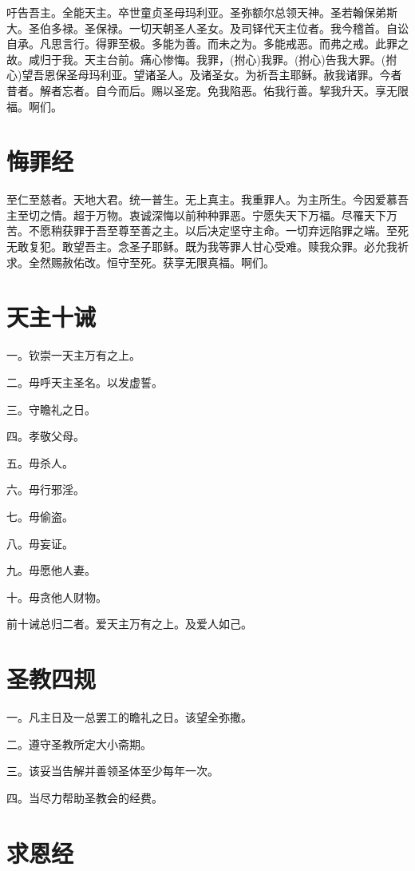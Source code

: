 \documentclass[UTF8,17pt]{ctexart}
\begin{document}
吁告吾主。全能天主。卒世童贞圣母玛利亚。圣弥额尔总领天神。圣若翰保弟斯大。圣伯多禄。圣保禄。一切天朝圣人圣女。及司铎代天主位者。我今稽首。自讼自承。凡思言行。得罪至极。多能为善。而未之为。多能戒恶。而弗之戒。此罪之故。咸归于我。天主台前。痛心惨悔。我罪，(拊心)我罪。(拊心)告我大罪。(拊心)望吾恩保圣母玛利亚。望诸圣人。及诸圣女。为祈吾主耶稣。赦我诸罪。今者昔者。解者忘者。自今而后。赐以圣宠。免我陷恶。佑我行善。挈我升天。享无限福。啊们。

\section{悔罪经}
\label{hui-zui-jing}

至仁至慈者。天地大君。统一普生。无上真主。我重罪人。为主所生。今因爱慕吾主至切之情。超于万物。衷诚深悔以前种种罪恶。宁愿失天下万福。尽罹天下万苦。不愿稍获罪于吾至尊至善之主。以后决定坚守主命。一切弃远陷罪之端。至死无敢复犯。敢望吾主。念圣子耶稣。既为我等罪人甘心受难。赎我众罪。必允我祈求。全然赐赦佑改。恒守至死。获享无限真福。啊们。

\section{天主十诫}
\label{tian-zhu-shi-jie}

一。钦崇一天主万有之上。 

二。毋呼天主圣名。以发虚誓。 

三。守瞻礼之日。 

四。孝敬父母。

五。毋杀人。

六。毋行邪淫。

七。毋偷盗。

八。毋妄证。

九。毋愿他人妻。

十。毋贪他人财物。 

前十诫总归二者。爱天主万有之上。及爱人如己。

\section{圣教四规}
\label{sheng-jiao-si-gui}

一。凡主日及一总罢工的瞻礼之日。该望全弥撒。

二。遵守圣教所定大小斋期。 

三。该妥当告解并善领圣体至少每年一次。

四。当尽力帮助圣教会的经费。

\section{求恩经}
\end{document}
